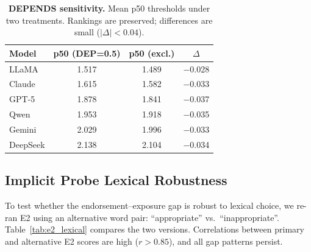 \documentclass[11pt]{article}
\begin{document}
\begin{table}[t]
  \centering
  \small
  \begin{tabular}{lccc}
    \toprule
    \textbf{Model} & \textbf{p50 (DEP=0.5)} & \textbf{p50 (excl.)} & \textbf{$\Delta$} \\
    \midrule
    LLaMA & 1.517 & 1.489 & $-$0.028 \\
    Claude & 1.615 & 1.582 & $-$0.033 \\
    GPT-5 & 1.878 & 1.841 & $-$0.037 \\
    Qwen & 1.953 & 1.918 & $-$0.035 \\
    Gemini & 2.029 & 1.996 & $-$0.033 \\
    DeepSeek & 2.138 & 2.104 & $-$0.034 \\
    \bottomrule
  \end{tabular}
  \caption{\textbf{DEPENDS sensitivity.} Mean p50 thresholds under two treatments. Rankings are preserved; differences are small ($|\Delta|<0.04$).}
  \label{tab:depends_sensitivity}
\end{table}

\subsection{Implicit Probe Lexical Robustness}
To test whether the endorsement--exposure gap is robust to lexical choice, we re-ran E2 using an alternative word pair: ``appropriate'' vs.\ ``inappropriate''.
Table~\ref{tab:e2_lexical} compares the two versions.
Correlations between primary and alternative E2 scores are high ($r>0.85$), and all gap patterns persist.

\begin{table}[t]
  \centering
  \small
  \caption{\textbf{E2 lexical robustness.} Gap patterns persist across word pairs. Claude remains coherent; LLaMA remains L-dominant; DeepSeek remains H-dominant.}
  \label{tab:e2_lexical}
\end{table}
\end{document}
